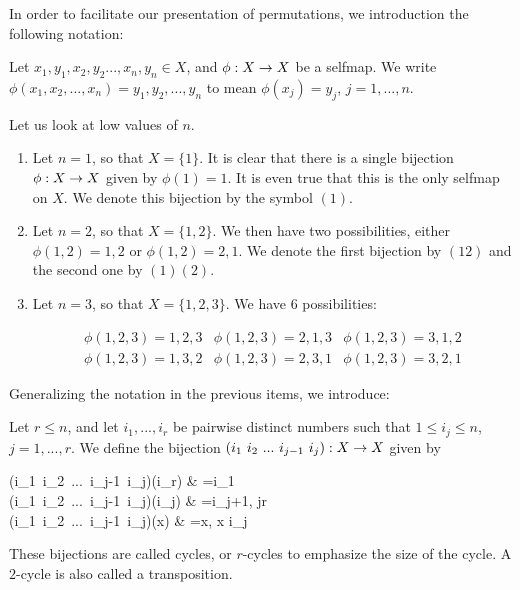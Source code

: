 In order to facilitate our presentation of permutations, we introduction the following notation:

\begin{definition}
	Let $x_1, y_1, x_2, y_2. .., x_n, y_n \in X$, and $\phi:X\rightarrow X$ be a selfmap. We write $\phi(x_1, x_2, ..., x_n) = y_1,y_2, ..., y_n$ to mean $\phi(x_j) = y_j$, $j=1,...,n$.
\end{definition}

\begin{exmp}
	Let us look at low values of $n$.
	
	\begin{enumerate}
		\item 	Let $n=1$, so that $X = \{1\}$. It is clear that there is a single bijection $\phi: X \rightarrow X$ given by $\phi(1)=1$. It is even true that this is the only selfmap on $X$. We denote this bijection by the symbol $(1)$.
		
		\item Let $n=2$, so that $X = \{1,2 \}$. We then have two possibilities, either $\phi(1,2)=1,2$ or $\phi(1,2)=2,1$. We denote the first bijection by $(12)$ and the second one by $(1)(2)$.
		
		\item Let $n=3$, so that $X = \{1,2, 3 \}$. We have 6 possibilities:
		
		$$\begin{array}{ccc}
		\phi(1,2,3)=1,2,3	& \phi(1,2,3)= 2,1,3 & \phi(1,2,3)= 3,1,2 \\ 
		\phi(1,2,3)= 1,3,2 & \phi(1,2,3)= 2,3,1 & \phi(1,2,3)= 3,2,1
		\end{array}$$ 
	\end{enumerate}
\end{exmp}

Generalizing the notation in the previous items, we introduce:

\begin{definition}
	Let $r \leq n$, and let $i_1, ...,  i_r$ be pairwise distinct numbers such that $1 \leq i_j \leq n$, $j=1, ..., r$. We define the bijection $(i_1\ i_2\ ...\ i_{j-1}\ i_j):X\raw X$ given by
	
	\begin{flalign*}
	(i_1\ i_2\ ...\ i_{j-1}\ i_j)(i_r) & =i_1 \\
	(i_1\ i_2\ ...\ i_{j-1}\ i_j)(i_j) & =i_{j+1}, j\neq r	\\ 
	(i_1\ i_2\ ...\ i_{j-1}\ i_j)(x) & =x, x \neq i_j		
	\end{flalign*}
	
	\noindent These bijections are called cycles, or $r$-cycles to emphasize the size of the cycle. A $2$-cycle is also called a transposition. 
\end{definition}

